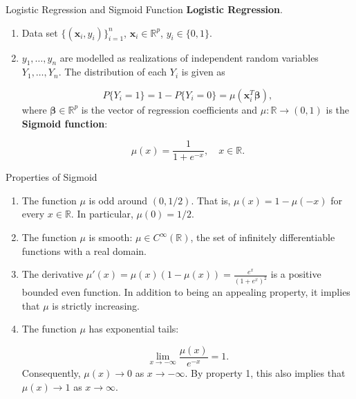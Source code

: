 \documentclass{beamer}
\newcommand{\bracket}[1]{\left ( #1 \right )}
\begin{document}
\begin{frame}{Logistic Regression and Sigmoid Function}
    \textbf{Logistic Regression}.

    \begin{enumerate}
    \item Data set $\{(\bm{x}_i, y_i)\}_{i=1}^n$, $\bm{x}_i \in \mathbb{R}^p$, $y_i \in \{0,1\}$.
    \item $y_1, \ldots, y_n$ are modelled as realizations of independent random variables $Y_1, \ldots, Y_n$.
    The distribution of each $Y_i$ is given as

    \begin{equation*}
        P \{Y_i = 1\} = 1- P \{Y_i = 0\} = \mu(\bm{x}_i^T \bm{\beta}),
    \end{equation*}
    where $\bm{\beta} \in \mathbb{R}^p$ is the vector of regression coefficients and 
    $\mu: \mathbb{R} \to (0, 1)$ is the \textbf{Sigmoid function}:
    
    \begin{equation*}
        \mu(x) = \frac{1}{1+e^{-x}}, \quad x \in \mathbb{R}.
    \end{equation*}
    \end{enumerate}
    
\end{frame}

\begin{frame}{Properties of Sigmoid}
    \begin{enumerate}
  \item The function $\mu$ is odd around $\bracket{0, 1/2}$. 
  That is, $\mu(x)=1-\mu(-x)$ for every $x \in \mathbb{R}$. In particular, $\mu(0)= 1/2$.
  \item The function $\mu$ is smooth: $\mu \in C^{\infty}(\mathbb{R})$, 
  the set of infinitely differentiable functions with a real domain.
  \item The derivative $\mu'(x)=\mu(x)(1-\mu(x)) = \frac{e^x}{(1+e^x)^2}$ is a positive bounded even function.
  In addition to being an appealing property, it implies that $\mu$ is strictly increasing.
  \item The function $\mu$ has exponential tails:
  
  \begin{equation*}
    \lim_{x \to -\infty}\frac{\mu(x)}{e^{-x}} = 1.
  \end{equation*}
  Consequently, $\mu(x) \to 0$ as $x \to -\infty$. 
  By property 1, this also implies that
  $\mu(x) \to 1$ as $x \to \infty$.
\end{enumerate}
    
\end{frame}
\end{document}

